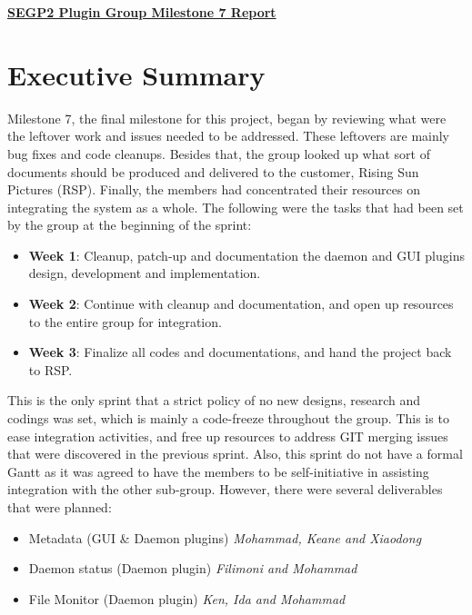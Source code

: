 \documentclass{article}
\begin{document}
\pagestyle{headings}

\begin{center}
{\textbf{\underline{SEGP2 Plugin Group Milestone 7 Report}}}
\end{center}


\section*{Executive Summary}

Milestone 7, the final milestone for this project, began by reviewing what were the leftover work and issues needed to be addressed. These leftovers are mainly bug fixes and code cleanups. Besides that, the group looked up what sort of documents should be produced and delivered to the customer, Rising Sun Pictures (RSP). Finally, the members had concentrated their resources on integrating the system as a whole. The following were the tasks that had been set by the group at the beginning of the sprint:

\begin{itemize}
    \item \textbf{Week 1}: Cleanup, patch-up and documentation the daemon and GUI plugins design, development and implementation.
    \item \textbf{Week 2}: Continue with cleanup and documentation, and open up resources to the entire group for integration.
    \item \textbf{Week 3}: Finalize all codes and documentations, and hand the project back to RSP. 
\end{itemize}

This is the only sprint that a strict policy of no new designs, research and codings was set, which is mainly a code-freeze throughout the group. This is to ease integration activities, and free up resources to address GIT merging issues that were discovered in the previous sprint. Also, this sprint do not have a formal Gantt as it was agreed to have the members to be self-initiative in assisting integration with the other sub-group. However, there were several deliverables that were planned:

\begin{itemize}
    \item Metadata (GUI \& Daemon plugins) \textsl{Mohammad, Keane and Xiaodong}
    \item Daemon status (Daemon plugin) \textsl{Filimoni and Mohammad}
    \item File Monitor (Daemon plugin) \textsl{Ken, Ida and Mohammad}
\end{itemize}
\end{document}
